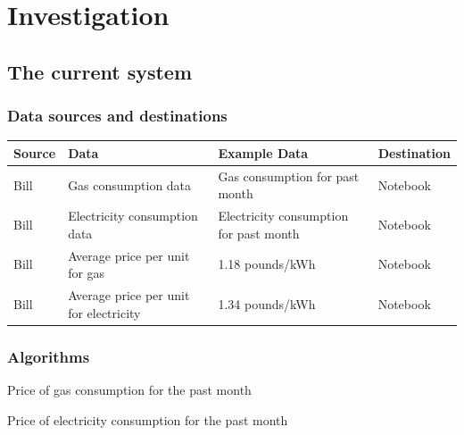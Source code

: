 \section{Investigation}

\subsection{The current system}

\subsubsection{Data sources and destinations}
\begin{center}
\begin{tabular}{|l|l|l|l|}
	\hline
	\textbf{Source} & \textbf{Data} & \textbf{Example Data} & \textbf{Destination} \\ \hline
	Bill & Gas consumption data & Gas consumption for past month & Notebook \\ \hline
	Bill & Electricity consumption data & Electricity consumption for past month & Notebook \\ \hline
	Bill & Average price per unit for gas & 1.18 pounds/kWh & Notebook \\ \hline
 	Bill & Average price per unit for electricity & 1.34 pounds/kWh & Notebook \\ \hline
\end{tabular}
\label{tab:Data sources and destinations for the current system}
\end{center}

\subsubsection{Algorithms}
\begin{algorithm}[H]
	\caption{Price of gas consumption for the past month}
\begin{algorithmic}[H]
\end{algorithmic}
\end{algorithm}

\begin{algorithm}[H]
	\caption{Price of electricity consumption for the past month}
\begin{algorithmic}[H]
\end{algorithmic}
\end{algorithm}

